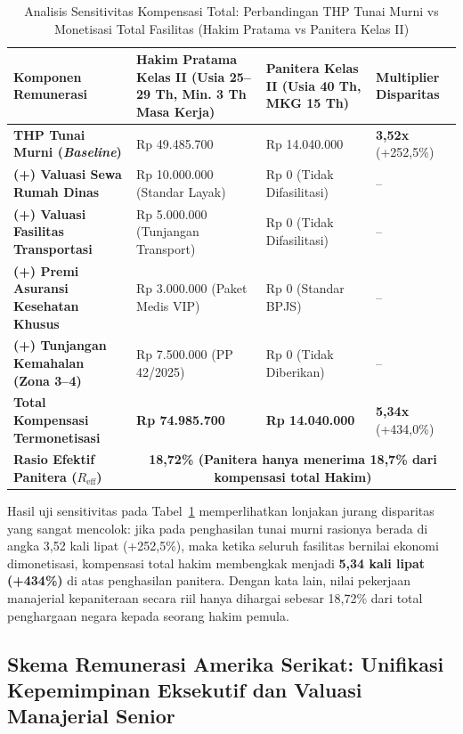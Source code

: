 \documentclass[12pt, a4paper]{article}
\begin{document}
\begin{table}[H]
\centering
\fontsize{9}{11}\selectfont
\caption{Analisis Sensitivitas Kompensasi Total: Perbandingan THP Tunai Murni vs Monetisasi Total Fasilitas (Hakim Pratama vs Panitera Kelas II)}
\label{tab:sensitivitas-monetisasi-lengkap}
\renewcommand{\arraystretch}{1.35}
\begin{tabular}{p{4.3cm} p{3.6cm} p{3.6cm} p{2.5cm}}
\hline
\textbf{Komponen Remunerasi} & \textbf{Hakim Pratama Kelas II (Usia 25--29 Th, Min. 3 Th Masa Kerja)} & \textbf{Panitera Kelas II (Usia 40 Th, MKG 15 Th)} & \textbf{Multiplier} \newline \textbf{Disparitas} \tabularnewline
\hline
\raggedright\textbf{THP Tunai Murni (\textit{Baseline})} & Rp 49.485.700 & Rp 14.040.000 & \textbf{3,52x} (+252,5\%) \tabularnewline
\raggedright\textbf{(+) Valuasi Sewa Rumah Dinas} & Rp 10.000.000 (Standar Layak) & Rp 0 (Tidak Difasilitasi) & -- \tabularnewline
\raggedright\textbf{(+) Valuasi Fasilitas Transportasi} & Rp 5.000.000 (Tunjangan Transport) & Rp 0 (Tidak Difasilitasi) & -- \tabularnewline
\raggedright\textbf{(+) Premi Asuransi Kesehatan Khusus} & Rp 3.000.000 (Paket Medis VIP) & Rp 0 (Standar BPJS) & -- \tabularnewline
\raggedright\textbf{(+) Tunjangan Kemahalan (Zona 3--4)} & Rp 7.500.000 (PP 42/2025) & Rp 0 (Tidak Diberikan) & -- \tabularnewline
\hline
\raggedright\textbf{Total Kompensasi Termonetisasi} & \textbf{Rp 74.985.700} & \textbf{Rp 14.040.000} & \textbf{5,34x} (+434,0\%) \tabularnewline
\hline
\raggedright\textbf{Rasio Efektif Panitera ($R_{\text{eff}}$)} & \multicolumn{3}{c}{\textbf{18,72\% (Panitera hanya menerima 18,7\% dari kompensasi total Hakim)}} \tabularnewline
\hline
\end{tabular}
\end{table}

Hasil uji sensitivitas pada Tabel~\ref{tab:sensitivitas-monetisasi-lengkap} memperlihatkan lonjakan jurang disparitas yang sangat mencolok: jika pada penghasilan tunai murni rasionya berada di angka 3,52 kali lipat (+252,5\%), maka ketika seluruh fasilitas bernilai ekonomi dimonetisasi, kompensasi total hakim membengkak menjadi \textbf{5,34 kali lipat (+434\%)} di atas penghasilan panitera. Dengan kata lain, nilai pekerjaan manajerial kepaniteraan secara riil hanya dihargai sebesar 18,72\% dari total penghargaan negara kepada seorang hakim pemula.

\subsection{Skema Remunerasi Amerika Serikat: Unifikasi Kepemimpinan Eksekutif dan Valuasi Manajerial Senior}
\end{document}
